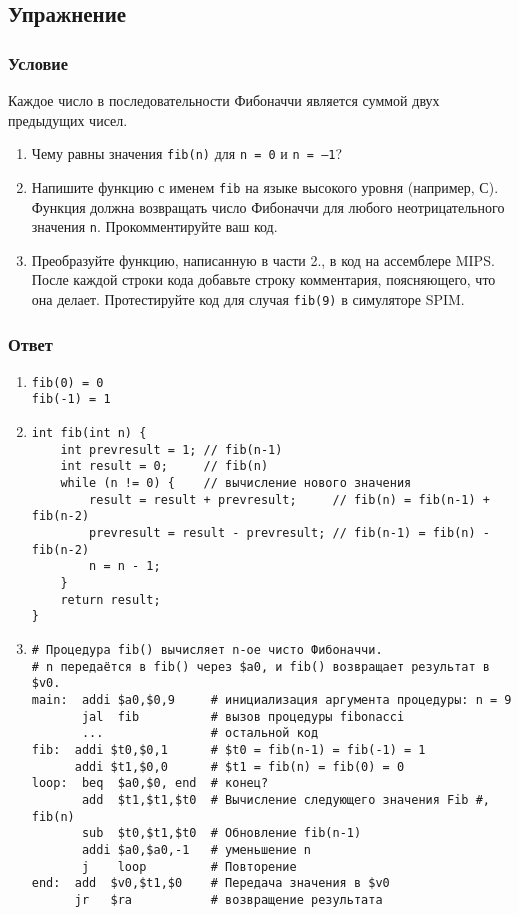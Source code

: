 \documentclass[12pt]{article}
\newenvironment{e}[1][dummy label]{
    \subsection{Упражнение}\label{#1}
    \subsubsection*{Условие}
    }{
    \subsubsection*{Ответ}
}
\begin{document}
    \begin{e}
        Каждое число в последовательности Фибоначчи является суммой двух предыдущих чисел.
        \begin{enumerate}
            \item Чему равны значения \texttt{fib(n)} для \texttt{n = 0} и \texttt{n = –1}?
            \item Напишите функцию с именем \texttt{fib} на языке высокого уровня (например, С). Функция должна возвращать число Фибоначчи для любого неотрицательного значения \texttt{n}. Прокомментируйте ваш код.
            \item Преобразуйте функцию, написанную в части 2., в код на ассемблере MIPS. После каждой строки кода добавьте строку комментария, поясняющего, что она делает. Протестируйте код для случая \texttt{fib(9)} в симуляторе SPIM.
        \end{enumerate}
    \end{e}

    \begin{enumerate}
        \item
        \begin{verbatim}
fib(0) = 0
fib(-1) = 1
        \end{verbatim}
        \item
        \begin{verbatim}
int fib(int n) {
    int prevresult = 1; // fib(n-1)
    int result = 0;     // fib(n)
    while (n != 0) {    // вычисление нового значения
        result = result + prevresult;     // fib(n) = fib(n-1) + fib(n-2)
        prevresult = result - prevresult; // fib(n-1) = fib(n) - fib(n-2)
        n = n - 1;
    }
    return result;
}
        \end{verbatim}
        \newpage
        \item
        \begin{verbatim}
# Процедура fib() вычисляет n-ое чисто Фибоначчи.
# n передаётся в fib() через $a0, и fib() возвращает результат в $v0.
main:  addi $a0,$0,9     # инициализация аргумента процедуры: n = 9
       jal  fib          # вызов процедуры fibonacci
       ...               # остальной код
fib:  addi $t0,$0,1      # $t0 = fib(n-1) = fib(-1) = 1
      addi $t1,$0,0      # $t1 = fib(n) = fib(0) = 0
loop:  beq  $a0,$0, end  # конец?
       add  $t1,$t1,$t0  # Вычисление следующего значения Fib #, fib(n)
       sub  $t0,$t1,$t0  # Обновление fib(n-1)
       addi $a0,$a0,-1   # уменьшение n
       j    loop         # Повторение
end:  add  $v0,$t1,$0    # Передача значения в $v0
      jr   $ra           # возвращение результата
        \end{verbatim}
    \end{enumerate}
\end{document}
